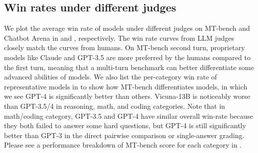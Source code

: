 \subsection{Win rates under different judges}
We plot the average win rate of models under different judges on MT-bench and Chatbot Arena in  and , respectively. The win rate curves from LLM judges closely match the curves from humans. On MT-bench second turn, proprietary models like Claude and GPT-3.5 are more preferred by the humans compared to the first turn, meaning that a multi-turn benchmark can better differentiate some advanced abilities of models. We also list the per-category win rate of representative models in  to show how MT-bench differentiates models, in which we see GPT-4 is significantly better than others.
Vicuna-13B is noticeably worse than GPT-3.5/4 in reasoning, math, and coding categories.
Note that in math/coding category, GPT-3.5 and GPT-4 have similar overall win-rate because they both failed to answer some hard questions, but GPT-4 is still significantly better than GPT-3 in the direct pairwise comparison or single-answer grading.
Please see a performance breakdown of MT-bench score for each category in .